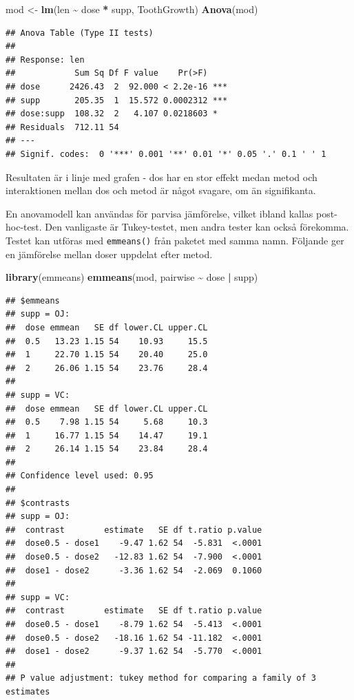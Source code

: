 \documentclass[
]{book}
\newenvironment{Shaded}{\begin{snugshade}}{\end{snugshade}}
\newcommand{\FunctionTok}[1]{\textcolor[rgb]{0.13,0.29,0.53}{\textbf{#1}}}
\newcommand{\NormalTok}[1]{#1}
\newcommand{\OtherTok}[1]{\textcolor[rgb]{0.56,0.35,0.01}{#1}}
\newcommand{\SpecialCharTok}[1]{\textcolor[rgb]{0.81,0.36,0.00}{\textbf{#1}}}
\theoremstyle{definition}
\theoremstyle{definition}
\theoremstyle{definition}
\theoremstyle{definition}
\theoremstyle{remark}
\begin{document}
\begin{Shaded}
\begin{Highlighting}[]
\NormalTok{mod }\OtherTok{\textless{}{-}} \FunctionTok{lm}\NormalTok{(len }\SpecialCharTok{\textasciitilde{}}\NormalTok{ dose }\SpecialCharTok{*}\NormalTok{ supp, ToothGrowth)}
\FunctionTok{Anova}\NormalTok{(mod)}
\end{Highlighting}
\end{Shaded}

\begin{verbatim}
## Anova Table (Type II tests)
## 
## Response: len
##            Sum Sq Df F value    Pr(>F)    
## dose      2426.43  2  92.000 < 2.2e-16 ***
## supp       205.35  1  15.572 0.0002312 ***
## dose:supp  108.32  2   4.107 0.0218603 *  
## Residuals  712.11 54                      
## ---
## Signif. codes:  0 '***' 0.001 '**' 0.01 '*' 0.05 '.' 0.1 ' ' 1
\end{verbatim}

Resultaten är i linje med grafen - dos har en stor effekt medan metod och interaktionen mellan dos och metod är något svagare, om än signifikanta.

En anovamodell kan användas för parvisa jämförelse, vilket ibland kallas post-hoc-test. Den vanligaste är Tukey-testet, men andra tester kan också förekomma. Testet kan utföras med \texttt{emmeans()} från paketet med samma namn. Följande ger en jämförelse mellan doser uppdelat efter metod.

\begin{Shaded}
\begin{Highlighting}[]
\FunctionTok{library}\NormalTok{(emmeans)}
\FunctionTok{emmeans}\NormalTok{(mod, pairwise }\SpecialCharTok{\textasciitilde{}}\NormalTok{ dose }\SpecialCharTok{|}\NormalTok{ supp)}
\end{Highlighting}
\end{Shaded}

\begin{verbatim}
## $emmeans
## supp = OJ:
##  dose emmean   SE df lower.CL upper.CL
##  0.5   13.23 1.15 54    10.93     15.5
##  1     22.70 1.15 54    20.40     25.0
##  2     26.06 1.15 54    23.76     28.4
## 
## supp = VC:
##  dose emmean   SE df lower.CL upper.CL
##  0.5    7.98 1.15 54     5.68     10.3
##  1     16.77 1.15 54    14.47     19.1
##  2     26.14 1.15 54    23.84     28.4
## 
## Confidence level used: 0.95 
## 
## $contrasts
## supp = OJ:
##  contrast        estimate   SE df t.ratio p.value
##  dose0.5 - dose1    -9.47 1.62 54  -5.831  <.0001
##  dose0.5 - dose2   -12.83 1.62 54  -7.900  <.0001
##  dose1 - dose2      -3.36 1.62 54  -2.069  0.1060
## 
## supp = VC:
##  contrast        estimate   SE df t.ratio p.value
##  dose0.5 - dose1    -8.79 1.62 54  -5.413  <.0001
##  dose0.5 - dose2   -18.16 1.62 54 -11.182  <.0001
##  dose1 - dose2      -9.37 1.62 54  -5.770  <.0001
## 
## P value adjustment: tukey method for comparing a family of 3 estimates
\end{verbatim}
\end{document}
